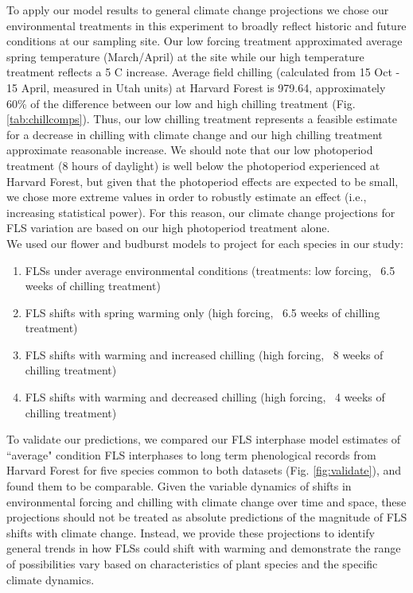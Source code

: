 \documentclass[11pt]{article}\usepackage[]{graphicx}\usepackage[]{color}
\begin{document}
\noindent To apply our model results to general climate change projections we chose our environmental treatments in this experiment to broadly reflect historic and future conditions at our sampling site. Our low forcing treatment approximated average spring temperature (March/April) at the site while our high temperature treatment reflects a 5 \degree C increase. Average field chilling (calculated from 15 Oct - 15 April, measured in Utah units) at Harvard Forest is 979.64, approximately 60\% of the difference between our low and high chilling treatment (Fig. \ref{tab:chillcomps}). Thus, our low chilling treatment represents a feasible estimate for a decrease in chilling with climate change and our high chilling treatment approximate reasonable increase. We should note that our low photoperiod treatment (8 hours of daylight) is well below the photoperiod experienced at Harvard Forest, but given that the photoperiod effects are expected to be small, we chose more extreme values in order to robustly estimate an effect (i.e., increasing statistical power). For this reason, our climate change projections for FLS variation are based on our high photoperiod treatment alone.\\

\noindent We used our flower and budburst models to project for each species in our study:\\
\begin{enumerate}
\item FLSs under average environmental conditions  (treatments: low forcing, ~6.5 weeks of chilling treatment)
\item FLS shifts with spring warming only (high forcing, ~6.5 weeks of chilling treatment)
\item FLS shifts with warming and increased chilling (high forcing, ~8 weeks of chilling treatment)
\item FLS shifts with warming and decreased chilling (high forcing, ~4 weeks of chilling treatment)
\end{enumerate}

\noindent To validate our predictions, we compared our FLS interphase model estimates of ``average" condition FLS interphases to long term phenological records from Harvard Forest \citep{OKeefe2015} for five species common to both datasets (Fig. \ref{fig:validate}), and found them to be comparable. Given the variable dynamics of shifts in environmental forcing and chilling with climate change over time and space, these projections should not be treated as absolute predictions of the magnitude of FLS shifts with climate change. Instead, we provide these projections to identify general trends in how FLSs could shift with warming and demonstrate the range of possibilities vary based on characteristics of plant species and the specific climate dynamics.\\
\end{document}

